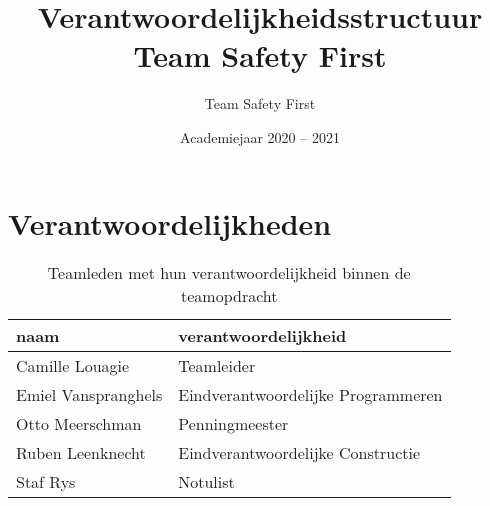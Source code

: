 \documentclass[a4paper,kulak]{kulakarticle} %
\date{Academiejaar 2020 -- 2021}
\title{Verantwoordelijkheidsstructuur Team Safety First}
\author{Team Safety First}
\begin{document}
\maketitle
\section{Verantwoordelijkheden}

\begin{table}[h]
	\caption{Teamleden met hun verantwoordelijkheid binnen de teamopdracht}
	\centering
	\begin{tabular}{l|l}
		naam                &               verantwoordelijkheid \\ 
		\hline
		Camille Louagie     &                         Teamleider \\
		Emiel Vanspranghels & Eindverantwoordelijke Programmeren \\
		Otto Meerschman     &                     Penningmeester \\
		Ruben Leenknecht    &  Eindverantwoordelijke Constructie \\
		Staf Rys            &                           Notulist \\
	\end{tabular}

\end{table}
\end{document}
